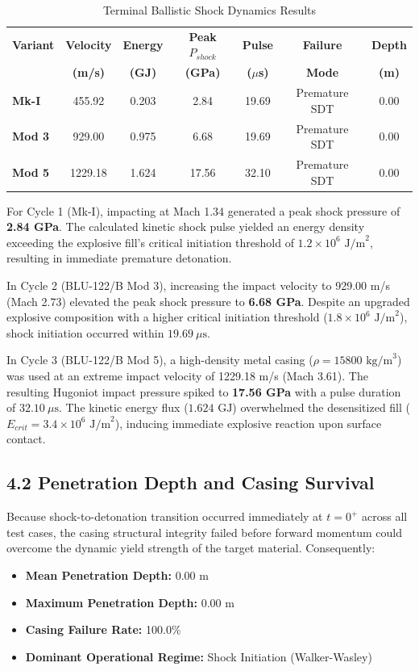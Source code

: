 \documentclass[journal,10pt,twocolumn]{IEEEtran}
\begin{document}
\begin{table}[htbp]
\caption{Terminal Ballistic Shock Dynamics Results}
\begin{center}
\begin{tabular}{lcccccc}
\toprule
\textbf{Variant} & \textbf{Velocity} & \textbf{Energy} & \textbf{Peak $P_{shock}$} & \textbf{Pulse} & \textbf{Failure} & \textbf{Depth} \\
\textbf{} & \textbf{(m/s)} & \textbf{(GJ)} & \textbf{(GPa)} & \textbf{($\mu$s)} & \textbf{Mode} & \textbf{(m)} \\
\midrule
\textbf{Mk-I} & 455.92 & 0.203 & 2.84 & 19.69 & Premature SDT & 0.00 \\
\textbf{Mod 3} & 929.00 & 0.975 & 6.68 & 19.69 & Premature SDT & 0.00 \\
\textbf{Mod 5} & 1229.18 & 1.624 & 17.56 & 32.10 & Premature SDT & 0.00 \\
\bottomrule
\end{tabular}
\end{center}
\end{table}

For Cycle 1 (Mk-I), impacting at Mach 1.34 generated a peak shock pressure of \textbf{2.84 GPa}. The calculated kinetic shock pulse yielded an energy density exceeding the explosive fill's critical initiation threshold of $1.2 \times 10^6 \text{ J/m}^2$, resulting in immediate premature detonation.

In Cycle 2 (BLU-122/B Mod 3), increasing the impact velocity to 929.00 m/s (Mach 2.73) elevated the peak shock pressure to \textbf{6.68 GPa}. Despite an upgraded explosive composition with a higher critical initiation threshold ($1.8 \times 10^6 \text{ J/m}^2$), shock initiation occurred within $19.69 \ \mu\text{s}$.

In Cycle 3 (BLU-122/B Mod 5), a high-density metal casing ($\rho = 15800 \text{ kg/m}^3$) was used at an extreme impact velocity of 1229.18 m/s (Mach 3.61). The resulting Hugoniot impact pressure spiked to \textbf{17.56 GPa} with a pulse duration of $32.10 \ \mu\text{s}$. The kinetic energy flux ($1.624 \text{ GJ}$) overwhelmed the desensitized fill ($E_{crit} = 3.4 \times 10^6 \text{ J/m}^2$), inducing immediate explosive reaction upon surface contact.

\subsection{4.2 Penetration Depth and Casing Survival}
Because shock-to-detonation transition occurred immediately at $t = 0^+$ across all test cases, the casing structural integrity failed before forward momentum could overcome the dynamic yield strength of the target material. Consequently:
\begin{itemize}
\item \textbf{Mean Penetration Depth:} 0.00 m
\item \textbf{Maximum Penetration Depth:} 0.00 m
\item \textbf{Casing Failure Rate:} 100.0\%
\item \textbf{Dominant Operational Regime:} Shock Initiation (Walker-Wasley)
\end{itemize}
\end{document}
